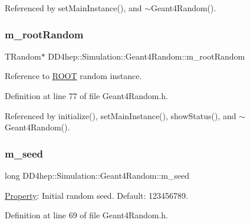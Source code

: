 Referenced by set\+Main\+Instance(), and $\sim$\+Geant4\+Random().

\hypertarget{class_d_d4hep_1_1_simulation_1_1_geant4_random_a026a1847cc9ce6ae7bae842fa6f4b452}{}\label{class_d_d4hep_1_1_simulation_1_1_geant4_random_a026a1847cc9ce6ae7bae842fa6f4b452} 
\subsubsection{\texorpdfstring{m\+\_\+root\+Random}{m\_rootRandom}}
{\footnotesize\ttfamily T\+Random$\ast$ D\+D4hep\+::\+Simulation\+::\+Geant4\+Random\+::m\+\_\+root\+Random\hspace{0.3cm}{\ttfamily [protected]}}



Reference to \hyperlink{namespace_r_o_o_t}{R\+O\+OT} random instance. 



Definition at line 77 of file Geant4\+Random.\+h.



Referenced by initialize(), set\+Main\+Instance(), show\+Status(), and $\sim$\+Geant4\+Random().

\hypertarget{class_d_d4hep_1_1_simulation_1_1_geant4_random_a24193f5a0f19684a176f12a5aedec2b2}{}\label{class_d_d4hep_1_1_simulation_1_1_geant4_random_a24193f5a0f19684a176f12a5aedec2b2} 
\subsubsection{\texorpdfstring{m\+\_\+seed}{m\_seed}}
{\footnotesize\ttfamily long D\+D4hep\+::\+Simulation\+::\+Geant4\+Random\+::m\+\_\+seed\hspace{0.3cm}{\ttfamily [protected]}}



\hyperlink{class_d_d4hep_1_1_property}{Property}\+: Initial random seed. Default\+: 123456789. 



Definition at line 69 of file Geant4\+Random.\+h.



